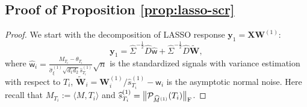 \documentclass[12pt]{article}
\def\wt{\widehat}
\def\sfw{\mathsf{w}}
\def\calP{{\mathcal P}}
\theoremstyle{plain}
\begin{document}
\subsection{Proof of Proposition \ref{prop:lasso-scr}}
\begin{proof}
We start with the decomposition of LASSO response $\mathbf{y}_1 = \mathbf{X}\mathbf{W}^{(1)}  $:
\begin{equation*}
   \mathbf{y}_1= \widehat{\Sigma}^{-\frac{1}{2}}\widehat{D}\widehat{\sfw} + \widehat{\Sigma}^{-\frac{1}{2}}\widehat{D}\widetilde{\mathbf{W}},
\end{equation*}
where $\widehat{\sfw}_i=  \frac{M_{T_i}-\theta_{T_i}}{\widehat\sigma_\xi^{(1)} \sqrt{d_1 d_2}\widehat{s}_{T_i}^{(1)} } \sqrt{n}$ is the standardized signals with variance estimation with respect to $T_i$, $\widetilde{\mathbf{W}}_i=\mathbf{W}_i^{(1)}/\widehat s_{T_i}^{(1)} -\sfw_i $ is the asymptotic normal noise. Here recall that $M_{T_i}:=\langle M, T_i\rangle$ and $\wt s_{T_i}^{(1)}=\big\|\calP_{\wt M^{(1)}}(T_i)\big\|_{\rm F}$. 



\end{proof}
\end{document}
